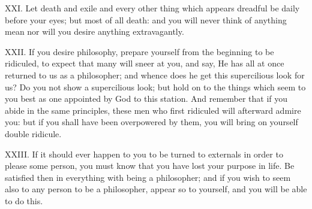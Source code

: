 XXI. Let death and exile and every other thing which appears dreadful be daily before your eyes; but most of all death: and you will never think of anything mean nor will you desire anything extravagantly.



XXII. If you desire philosophy, prepare yourself from the beginning to be ridiculed, to expect that many will sneer at you, and say, He has all at once returned to us as a philosopher; and whence does he get this supercilious look for us? Do you not show a supercilious look; but hold on to the things which seem to you best as one appointed by God to this station. And remember that if you abide in the same principles, these men who first ridiculed will afterward admire you: but if you shall have been overpowered by them, you will bring on yourself double ridicule.



XXIII. If it should ever happen to you to be turned to externals in order to please some person, you must know that you have lost your purpose in life. Be satisfied then in everything with being a philosopher; and if you wish to seem also to any person to be a philosopher, appear so to yourself, and you will be able to do this.



